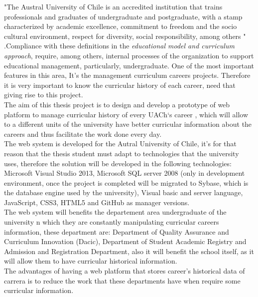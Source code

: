

"The Austral University of Chile is an accredited institution that trains professionals and graduates of undergraduate and postgraduate, with a stamp characterized by academic excellence, commitment to freedom and the socio cultural environment, respect for diversity, social responsibility, among others "\hspace{0.2cm} \cite{MOD07}.Compliance with these definitions in the \textit{educational model and curriculum approach}, require, among others, internal processes of the organization to support educational management, particularly, undergraduate. One of the most important features in this area, It’s the management curriculum careers projects. Therefore it is very important to know the curricular history of each career, need that giving rise to this project.
\\

The aim of this thesis project is to design and develop a prototype of web platform to manage curricular history of every UACh‘s career , which will allow to a different units of the university have better curricular information about the careers and thus facilitate the work done every day.
\\

The web system is developed for the Autral University of Chile, it’s for that reason that the thesis student must adapt to technologies that the university uses, therefore the solution will be developed in the following technologies: Microsoft Visual Studio 2013, Microsoft SQL server 2008 (only in development environment, once the project is completed will be migrated to Sybase, which is the database engine used by the university), Visual basic and server language, JavaScript, CSS3, HTML5 and GitHub as manager versions.
\\

The web system will benefits the departement area undergraduate of the university n which they are constantly manipulating curricular careers information, these department are: Department of Quality Assurance and Curriculum Innovation (Dacic), Department of Student Academic Registry and Admission and Registration Department, also it will benefit the school itself, as it will allow them to have curricular historical information.
\\

The advantages of having a web platform that stores career’s historical data of carrera is to reduce the work that these departments have when require some curricular information.